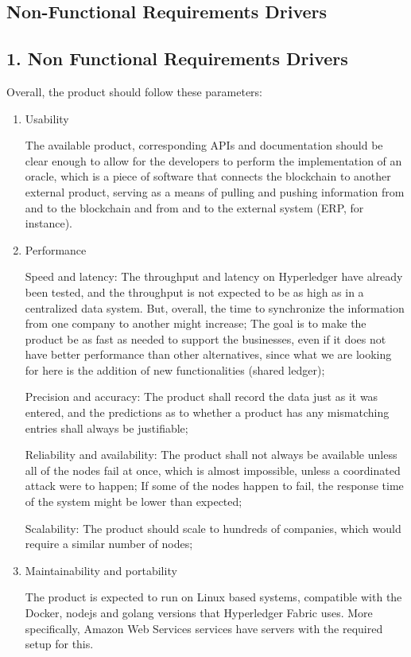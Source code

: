 		
\subsection{Non-Functional Requirements Drivers}
\subsection*{1. Non Functional Requirements Drivers}

Overall, the product should follow these parameters:
\begin{enumerate}
    \item  Usability
		\par The available product, corresponding APIs  and documentation should be clear enough to allow for the developers to perform the implementation of an oracle, which is a piece of software that connects the blockchain to another external product, serving as a means of pulling and pushing information from and to the blockchain and from and to the external system (ERP, for instance).
    \item  Performance
		\par Speed and latency: The throughput and latency on Hyperledger have already been tested, and the throughput is not expected to be as high as in a centralized data system. But, overall, the time to synchronize the information from one company to another might increase; The goal is to make the product be as fast as needed to support the businesses, even if it does not have better performance than other alternatives, since what we are looking for here is the addition of new functionalities (shared ledger);
		\par Precision and accuracy: The product shall record the data just as it was entered, and the predictions as to whether a product has any mismatching entries shall always be justifiable;
		\par Reliability and availability: The product shall not always be available unless all of the nodes fail at once, which is almost impossible, unless a coordinated attack were to happen; If some of the nodes happen to fail, the response time of the system might be lower than expected;
		\par Scalability: The product should scale to hundreds of companies, which would require a similar number of nodes;
    \item  Maintainability and portability
		\par The product is expected to run on Linux based systems, compatible with the Docker, nodejs and golang versions that Hyperledger Fabric uses. More specifically, Amazon Web Services services have servers with the required setup for this.

\end{enumerate}
